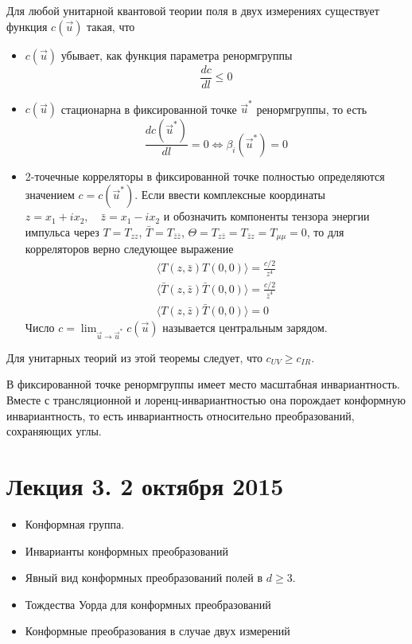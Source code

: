 \documentclass[a4paper,12pt]{article} \usepackage[utf8x]{inputenc} \usepackage[russian]{babel}
\theoremstyle{definition} \newtheorem{corollary}{Corollary}[theorem] \theoremstyle{definition}
\begin{document}
\begin{theorem} Для любой унитарной квантовой теории поля в двух измерениях существует функция
$c(\vec u)$ такая, что
  \label{c-theorem}
  \begin{itemize}
  \item $c(\vec u)$ убывает, как функция параметра ренормгруппы
    \begin{equation}
      \label{eq:95} \frac{dc}{dl}\leq 0
    \end{equation}
  \item $c(\vec u)$ стационарна в фиксированной точке $\vec u^*$ ренормгруппы, то есть
    \begin{equation}
      \label{eq:96} \frac{dc({\vec u^*})}{dl}=0 \Leftrightarrow \beta_i(\vec u^*)=0
    \end{equation}
  \item 2-точечные корреляторы в фиксированной точке полностью определяются значением $c=c(\vec
u^*)$. Если ввести комплексные координаты $z=x_1+ix_2,\quad \bar z=x_1-ix_2$ и обозначить компоненты
тензора энергии импульса через $T=T_{zz}$, $\bar T=T_{\bar z\bar z}$, $\Theta=T_{z\bar z}=T_{\bar z
z}=T_{\mu\mu}=0$, то для корреляторов верно следующее выражение
    \begin{eqnarray}
      \label{eq:97} \langle T(z,\bar z)T(0,0)\rangle=\frac{c/2}{z^4}\\ \langle \bar T(z,\bar z)\bar
T(0,0)\rangle=\frac{c/2}{\bar z^4}\\ \langle T(z,\bar z) \bar T(0,0)\rangle=0
    \end{eqnarray} Число $c=\lim_{\vec u\to \vec u^*} c(\vec u)$ называется центральным зарядом.
  \end{itemize}
\end{theorem} Для унитарных теорий из этой теоремы следует, что $c_{UV}\geq c_{IR}$.

В фиксированной точке ренормгруппы имеет место масштабная инвариантность. Вместе с трансляционной и
лоренц-инвариантностью она порождает конформную инвариантность, то есть инвариантность относительно
преобразований, сохраняющих углы.

\section{Лекция 3. 2 октября 2015}
\label{sec:-3}


  \begin{itemize}
  \item Конформная группа.
  \item Инварианты конформных преобразований
  \item Явный вид конформных преобразований полей в $d\geq 3$.
  \item Тождества Уорда для конформных преобразований
  \item Конформные преобразования в случае двух измерений
  \end{itemize}
\end{document}
